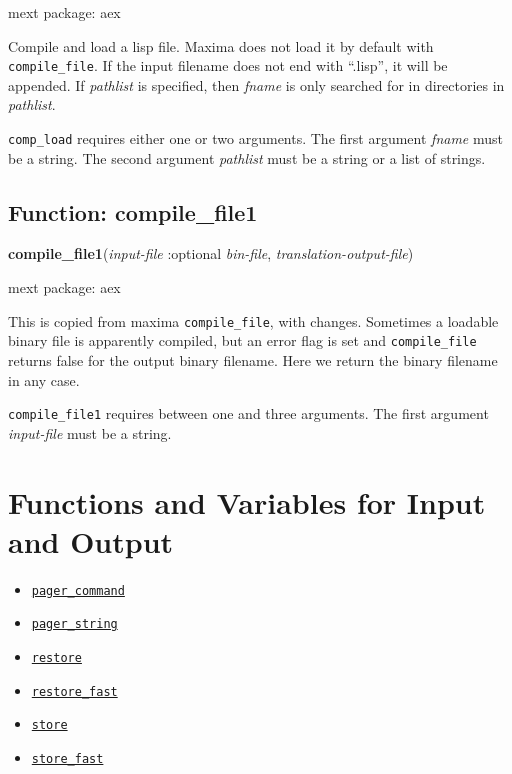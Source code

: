 \documentclass[]{article}
\begin{document}
\noindent mext package: aex



\vspace{5 pt}
Compile and load a lisp file. Maxima does not load it by default with {\tt compile\_file}. If the input filename does not end with ``.lisp'', it will be appended. If {\it pathlist} is specified, then {\it fname} is only searched for in directories in {\it pathlist}. 

\vspace{5 pt}

   {\tt comp\_load} requires either one or two arguments.
    The first argument {\it fname} must be a string.
    The second argument {\it pathlist} must be a string or a list of strings.


\vspace{5 pt}


\subsection{Function: compile\_file1\label{sec:compile_file1}}
\hypertarget{compile_file1}{}
{\bf compile\_file1}({\it input-file} :optional {\it bin-file}, {\it translation-output-file})


\noindent mext package: aex



\vspace{5 pt}
This is copied from maxima {\tt compile\_file}, with changes. Sometimes a loadable binary file is apparently compiled, but an error flag is set and {\tt compile\_file} returns false for the output binary filename. Here we return the binary filename in any case. 

\vspace{5 pt}

   {\tt compile\_file1} requires between one and three arguments.
    The first argument {\it input-file} must be a string.


\vspace{5 pt}


\section{Functions and Variables for Input and Output}
\begin{itemize}
\item \hyperlink{pager_command}{{\tt pager\_command}}
\item \hyperlink{pager_string}{{\tt pager\_string}}
\item \hyperlink{restore}{{\tt restore}}
\item \hyperlink{restore_fast}{{\tt restore\_fast}}
\item \hyperlink{store}{{\tt store}}
\item \hyperlink{store_fast}{{\tt store\_fast}}
\end{itemize}
\end{document}
